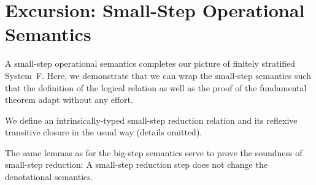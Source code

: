 \documentclass[acmsmall,anonymous,review,screen]{acmart}
\begin{document}






\section{Excursion: Small-Step Operational Semantics}
\label{sec:excurs-small-step}

A small-step operational semantics completes our picture of finitely
stratified System~F. Here, we demonstrate that we can wrap the small-step semantics such that the definition of the logical relation as well as the proof of the fundamental theorem adapt without any effort.

We define an intrinsically-typed small-step reduction relation and its
reflexive transitive closure in the usual way (details omitted).
\SmallStepSingleReduction
\SmallStepReduction

The same lemmas as for the big-step semantics serve to prove the
soundness of small-step reduction:
A small-step reduction step does not change the denotational semantics.
\SmallStepSoundness
\end{document}
